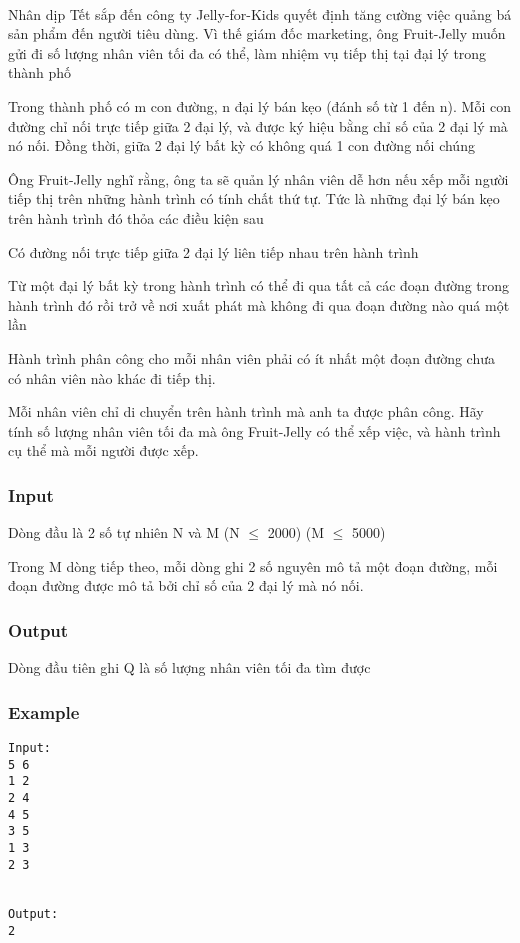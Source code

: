 

 

Nhân dịp Tết sắp đến công ty Jelly-for-Kids quyết định tăng cường việc quảng bá sản phẩm đến người tiêu dùng. Vì thế giám đốc marketing, ông Fruit-Jelly muốn gửi đi số lượng nhân viên tối đa có thể, làm nhiệm vụ tiếp thị tại đại lý trong thành phố

Trong thành phố có m con đường, n đại lý bán kẹo (đánh số từ 1 đến n). Mỗi con đường chỉ nối trực tiếp giữa 2 đại lý, và được ký hiệu bằng chỉ số của 2 đại lý mà nó nối. Đồng thời, giữa 2 đại lý bất kỳ có không quá 1 con đường nối chúng

Ông Fruit-Jelly nghĩ rằng, ông ta sẽ quản lý nhân viên dễ hơn nếu xếp mỗi người tiếp thị trên những hành trình có tính chất thứ tự. Tức là những đại lý bán kẹo trên hành trình đó thỏa các điều kiện sau

Có đường nối trực tiếp giữa 2 đại lý liên tiếp nhau trên hành trình

Từ một đại lý bất kỳ trong hành trình có thể đi qua tất cả các đoạn đường trong hành trình đó rồi trở về nơi xuất phát mà không đi qua đoạn đường nào quá một lần

Hành trình phân công cho mỗi nhân viên phải có ít nhất một đoạn đường chưa có nhân viên nào khác đi tiếp thị.

Mỗi nhân viên chỉ di chuyển trên hành trình mà anh ta được phân công. Hãy tính số lượng nhân viên tối đa mà ông Fruit-Jelly có thể xếp việc, và hành trình cụ thể mà mỗi người được xếp.

\subsubsection{Input}

Dòng đầu là 2 số tự nhiên N và M (N $\le$ 2000) (M $\le$ 5000)

Trong M dòng tiếp theo, mỗi dòng ghi 2 số nguyên mô tả một đoạn đường, mỗi đoạn đường được mô tả bởi chỉ số của 2 đại lý mà nó nối.

\subsubsection{Output}

Dòng đầu tiên ghi Q là số lượng nhân viên tối đa tìm được

\subsubsection{Example}
\begin{verbatim}
Input:
5 6
1 2
2 4
4 5
3 5
1 3
2 3


Output:
2
\end{verbatim}
